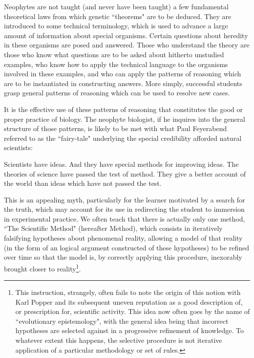 \begin{longquote}

Neophytes are not taught (and never have been taught) a few fundamental theoretical laws from which genetic ``theorems" are to be deduced. They are introduced to some technical terminology, which is used to advance a large amount of information about special organisms. Certain questions about heredity in these organisms are posed and answered. Those who understand the theory are those who know what questions are to be asked about hitherto unstudied examples, who know how to apply the technical language to the organisms involved in these examples, and
who can apply the patterns of reasoning which are to be instantiated in constructing answers. More simply, successful students grasp general patterns of reasoning which can be used to resolve new cases. \cite{Kitcher1984}

\end{longquote}

It is the effective use of these patterns of reasoning that constitutes the good or proper practice of biology. The neophyte biologist, if he inquires into the general structure of those patterns, is likely to be met with what Paul Feyerabend referred to as the ``fairy-tale" underlying the special credibility afforded natural scientists:

\begin{longquote}

Scientists have ideas. And they have special methods for improving ideas. The theories of science have passed the test of method. They give a better account of the world than ideas which have not passed the test. \cite{Feyerabend1993}

\end{longquote}

This is an appealing myth, particularly for the learner motivated by a search for the truth, which may account for its use in redirecting the student to immersion in experimental practice. We often teach that there is actually only one method, ``The Scientific Method" (hereafter Method), which consists in iteratively falsifying hypotheses about phenomenal reality, allowing a model of that reality (in the form of an logical argument constructed of these hypotheses) to be refined over time so that the model is, by correctly applying this procedure, inexorably brought closer to reality\footnote{This instruction, strangely, often fails to note the origin of this notion with Karl Popper and its subsequent uneven reputation as a good description of, or prescription for, scientific activity. This idea now often goes by the name of ``evolutionary epistemology", with the general idea being that incorrect hypotheses are selected against in a progressive refinement of knowledge. To whatever extent this happens, the selective procedure is not iterative application of a particular methodology or set of rules.}.

